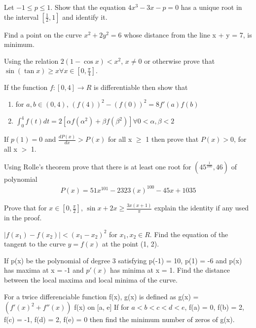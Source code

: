 \item Let $-1 \leq p \leq 1$. Show that the equation $4x^3 - 3x - p = 0$ has a unique root in the interval 
$[\frac{1}{2}, 1]$ and identify it.

\item Find a point on the curve $x^2 + 2y^2 = 6$ whose distance from the line x + y = 7, is minimum.

\item Using the relation $2(1 - \cos x) < x^2$, $x \neq  0$ or otherwise prove that $\sin(\tan x)\geq x \forall x \in [0, \frac{\pi}{4}]$.

\item If the function $f: [0, 4] \to R$ is differentiable then show that 
\begin{enumerate}
\item for $a, b \in(0, 4)$, $(f(4))^2 - (f(0))^2 = 8 f'(a)f(b)$
\item $\int_{0}^{4} f(t)dt = 2[\alpha f(\alpha^2) + \beta f(\beta^2)] \forall 0< \alpha, \beta < 2$
\end{enumerate}

\item If $p(1) = 0$ and $\frac{dP(x)}{dx} > P(x)$ for all x $\geq$ 1 then prove that $P(x) > 0$, for all x $>$ 1.

\item Using Rolle's theorem prove that there is at least one root for $(45^\frac{1}{100},46)$ of polynomial
\begin{align*}
P(x) = 51x^{101} - 2323(x)^{100} - 45x + 1035
\end{align*}

\item Prove that for $x \in [0, \frac{\pi}{2}]$, $\sin x + 2x \geq \frac{3x(x + 1)}{\pi}$ explain the identity if any used in the proof.

\item $|f(x_1) - f(x_2)| < (x_1 - x_2)^2$ for $x_1, x_2 \in R$. Find the equation of the tangent to the curve $y = f(x)$ at the point (1, 2).

\item If p(x) be the polynomial of degree 3 satisfying p(-1) = 10, p(1) = -6 and p(x) has maxima at x = -1
and $p'(x)$ has minima at x = 1. Find the distance between the local maxima and local minima of the curve.

\item For a twice differenciable function f(x), g(x) is defined as g(x) = $(f'(x)^2 + f''(x))$ f(x) on [a, e] If for $a < b < c < d < e$, f(a) = 0, f(b) = 2, f(c) = -1, f(d) = 2, f(e) = 0 then find the minimum number of zeros of g(x).

